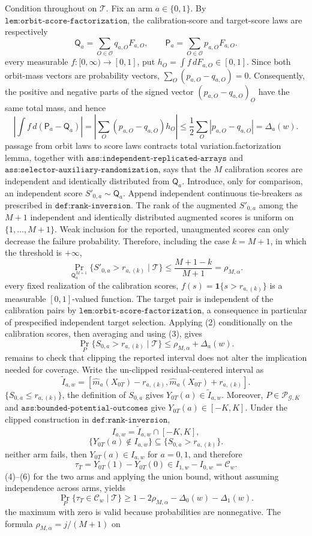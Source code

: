 Condition throughout on \(\mathcal T\). Fix an arm \(a\in\{0,1\}\). By \(\texttt{lem:orbit-score-factorization}\), the calibration-score and target-score laws are respectively\n\[\mathsf Q_a=\sum_{O\in\mathcal O}q_{a,O}F_{a,O},\qquad \mathsf P_a=\sum_{O\in\mathcal O}p_{a,O}F_{a,O}.\tag{1}\]\nFor every measurable \(f:[0,\infty)\to[0,1]\), put \(h_O=\int f\,dF_{a,O}\in[0,1]\). Since both orbit-mass vectors are probability vectors, \(\sum_O(p_{a,O}-q_{a,O})=0\). Consequently, the positive and negative parts of the signed vector \((p_{a,O}-q_{a,O})_O\) have the same total mass, and hence\n\[\left|\int f\,d(\mathsf P_a-\mathsf Q_a)\right|=\left|\sum_O(p_{a,O}-q_{a,O})h_O\right|\le \frac12\sum_O|p_{a,O}-q_{a,O}|=\Delta_a(w).\tag{2}\]\nThus passage from orbit laws to score laws contracts total variation.\n\nThe factorization lemma, together with \(\texttt{ass:independent-replicated-arrays}\) and \(\texttt{ass:selector-auxiliary-randomization}\), says that the \(M\) calibration scores are independent and identically distributed from \(\mathsf Q_a\). Introduce, only for comparison, an independent score \(S'_{0,a}\sim\mathsf Q_a\). Append independent continuous tie-breakers as prescribed in \(\texttt{def:rank-inversion}\). The rank of the augmented \(S'_{0,a}\) among the \(M+1\) independent and identically distributed augmented scores is uniform on \(\{1,\ldots,M+1\}\). Weak inclusion for the reported, unaugmented scores can only decrease the failure probability. Therefore, including the case \(k=M+1\), in which the threshold is \(+\infty\),\n\[\Pr_{\mathsf Q_a^{M+1}}\{S'_{0,a}>r_{a,(k)}\mid\mathcal T\}\le\frac{M+1-k}{M+1}=\rho_{M,\alpha}.\tag{3}\]\nFor every fixed realization of the calibration scores, \(f(s)=\mathbf 1\{s>r_{a,(k)}\}\) is a measurable \([0,1]\)-valued function. The target pair is independent of the calibration pairs by \(\texttt{lem:orbit-score-factorization}\), a consequence in particular of prespecified independent target selection. Applying (2) conditionally on the calibration scores, then averaging and using (3), gives\n\[\Pr_P\{S_{0,a}>r_{a,(k)}\mid\mathcal T\}\le\rho_{M,\alpha}+\Delta_a(w).\tag{4}\]\n\nIt remains to check that clipping the reported interval does not alter the implication needed for coverage. Write the un-clipped residual-centered interval as\n\[\widetilde I_{a,w}=[\widehat m_a(X_{0T})-r_{a,(k)},\widehat m_a(X_{0T})+r_{a,(k)}].\]\nOn \(\{S_{0,a}\le r_{a,(k)}\}\), the definition of \(S_{0,a}\) gives \(Y_{0T}(a)\in\widetilde I_{a,w}\). Moreover, \(P\in\mathcal P_{\mathcal G,K}\) and \(\texttt{ass:bounded-potential-outcomes}\) give \(Y_{0T}(a)\in[-K,K]\). Under the clipped construction in \(\texttt{def:rank-inversion}\),\n\[I_{a,w}=\widetilde I_{a,w}\cap[-K,K],\]\nso\n\[\{Y_{0T}(a)\notin I_{a,w}\}\subseteq\{S_{0,a}>r_{a,(k)}\}.\tag{5}\]\nIf neither arm fails, then \(Y_{0T}(a)\in I_{a,w}\) for \(a=0,1\), and therefore\n\[\tau_T=Y_{0T}(1)-Y_{0T}(0)\in I_{1,w}-I_{0,w}=\mathcal C_w.\tag{6}\]\nCombining (4)--(6) for the two arms and applying the union bound, without assuming independence across arms, yields\n\[\Pr_P\{\tau_T\in\mathcal C_w\mid\mathcal T\}\ge 1-2\rho_{M,\alpha}-\Delta_0(w)-\Delta_1(w).\]\nTaking the maximum with zero is valid because probabilities are nonnegative. The formula \(\rho_{M,\alpha}=j/(M+1)\) on 